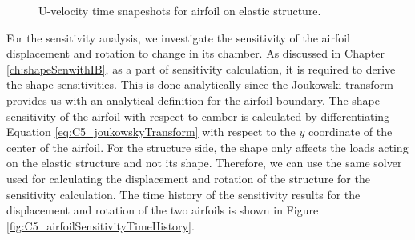 \begin{figure}[H]
{    }
    \quad
    \caption{U-velocity time snapeshots for airfoil on elastic structure.}
    \label{fig:C5_snapshotAirfoilSolution}
\end{figure}
%
For the sensitivity analysis, we investigate the sensitivity of the airfoil displacement and rotation to change in its chamber. As discussed in Chapter \ref{ch:shapeSenwithIB}, as a part of sensitivity calculation, it is required to derive the shape sensitivities. This is done analytically since the Joukowski transform provides us with an analytical definition for the airfoil boundary. The shape sensitivity of the airfoil with respect to camber is calculated by differentiating Equation \eqref{eq:C5_joukowskyTransform} with respect to the $y$ coordinate of the center of the airfoil. For the structure side, the shape only affects the loads acting on the elastic structure and not its shape. Therefore, we can use the same solver used for calculating the displacement and rotation of the structure for the sensitivity calculation. The time history of the sensitivity results for the displacement and rotation of the two airfoils is shown in Figure \ref{fig:C5_airfoilSensitivityTimeHistory}.
%
